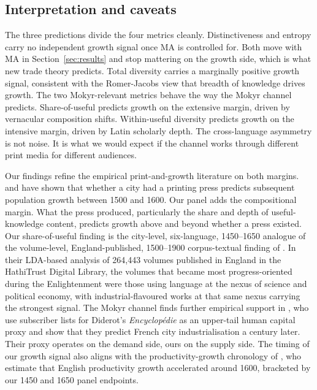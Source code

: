 \subsection{Interpretation and caveats}
\label{subsec:interpretation}

The three predictions divide the four metrics cleanly. Distinctiveness
and entropy carry no independent growth signal once MA is controlled
for. Both move with MA in Section~\ref{sec:results} and stop mattering
on the growth side, which is what new trade theory predicts. Total
diversity carries a marginally positive growth signal, consistent with
the Romer-Jacobs view that breadth of knowledge drives growth. The two
Mokyr-relevant metrics behave the way the Mokyr channel predicts.
Share-of-useful predicts growth on the extensive margin, driven by
vernacular composition shifts. Within-useful diversity predicts growth
on the intensive margin, driven by Latin scholarly depth. The
cross-language asymmetry is not noise. It is what we would expect if
the channel works through different print media for different
audiences.

Our findings refine the empirical print-and-growth literature on both
margins. \citet{Dittmar2011_information_technology} and
\citet{BoernerRubinSevergnini2021_eer} have shown that whether a city
had a printing press predicts subsequent population growth between
1500 and 1600. Our panel adds the compositional margin. What the
press produced, particularly the share and depth of useful-knowledge
content, predicts growth above and beyond whether a press existed.
Our share-of-useful finding is the city-level, six-language,
1450--1650 analogue of the volume-level, England-published, 1500--1900
corpus-textual finding of \citet{AlmelhemIyigunKennedyRubin2026_qje}.
In their LDA-based analysis of 264{,}443 volumes published in England
in the HathiTrust Digital Library, the volumes that became most
progress-oriented during the Enlightenment were those using language
at the nexus of science and political economy, with
industrial-flavoured works at that same nexus carrying the strongest
signal. The Mokyr channel finds further empirical support in
\citet{SquicciariniVoigtlander2015_qje}, who use subscriber lists for
Diderot's \emph{Encyclop\'edie} as an upper-tail human capital proxy
and show that they predict French city industrialisation a century
later. Their proxy operates on the demand side, ours on the supply
side. The timing of our growth signal also aligns with the
productivity-growth chronology of
\citet{BouscasseNakamuraSteinsson2025_qje}, who estimate that English
productivity growth accelerated around 1600, bracketed by our 1450 and
1650 panel endpoints.

